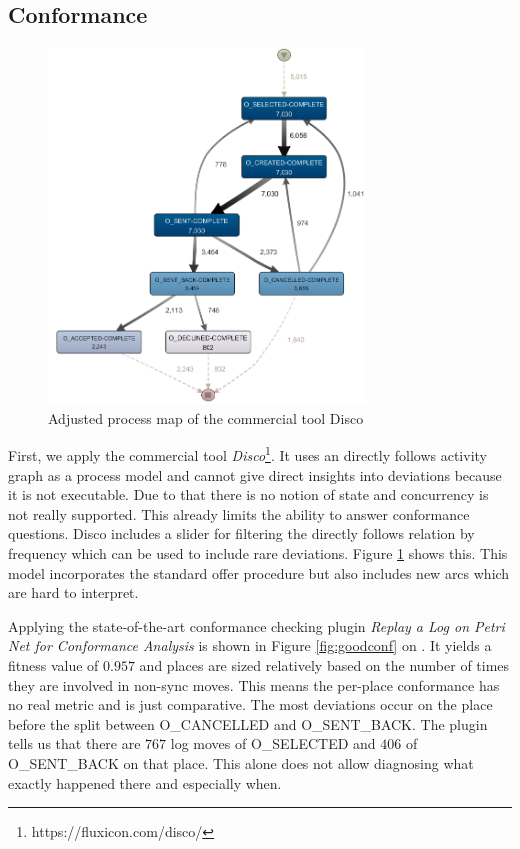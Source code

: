 \subsection*{Conformance}
\begin{figure}[H]
    \centering
    \includegraphics[width=0.75\textwidth]{figures/evaluation/disco_conf.png}
    \caption{Adjusted process map of the commercial tool Disco}
    \label{fig:discoconf}
\end{figure}

First, we apply the commercial tool \emph{Disco}\footnote{https://fluxicon.com/disco/}.
It uses an directly follows activity graph as a process model and cannot give direct insights into deviations because it is not executable. Due to that there is no notion of state and concurrency is not really supported.
This already limits the ability to answer conformance questions.
Disco includes a slider for filtering the directly follows relation by frequency which can be used to include rare deviations.
Figure \ref{fig:discoconf} shows this. This model incorporates the standard offer procedure but also includes new arcs which are hard to interpret.

Applying the state-of-the-art conformance checking plugin \emph{Replay a Log on Petri Net for Conformance Analysis} is shown in Figure \ref{fig:goodconf} on . It yields a fitness value of $0.957$ and places are sized relatively based on the number of times they are involved in non-sync moves. This means the per-place conformance has no real metric and is just comparative. The most deviations occur on the place before the split between \textsc{O\_CANCELLED} and \textsc{O\_SENT\_BACK}. The plugin tells us that there are $767$ log moves of \textsc{O\_SELECTED} and $406$ of \textsc{O\_SENT\_BACK} on that place. This alone does not allow diagnosing what exactly happened there and especially when.

